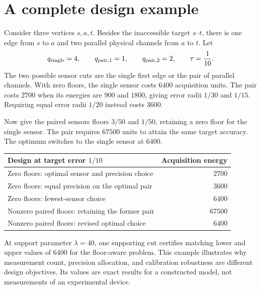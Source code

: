 \section{A complete design example}

Consider three vertices $s,a,t$. Besides the inaccessible target $s$--$t$,
there is one edge from $s$ to $a$ and two parallel physical channels from $a$
to $t$. Let
\[
 q_{\rm single}=4,\qquad q_{\rm pair,1}=1,\qquad
 q_{\rm pair,2}=2,\qquad \tau=\frac1{10}.
\]
The two possible sensor cuts are the single first edge or the pair of parallel
channels. With zero floors, the single sensor costs $6400$ acquisition units.
The pair costs $2700$ when its energies are $900$ and $1800$, giving error
radii $1/30$ and $1/15$. Requiring equal error radii $1/20$ instead costs $3600$.

Now give the paired sensors floors $3/50$ and $1/50$, retaining a zero floor
for the single sensor. The pair requires $67500$ units to attain the same target
accuracy. The optimum switches to the single sensor at $6400$.

\begin{center}
\begin{tabular}{lr}
\toprule
Design at target error $1/10$ & Acquisition energy\\
\midrule
Zero floors: optimal sensor and precision choice & $2700$\\
Zero floors: equal precision on the optimal pair & $3600$\\
Zero floors: fewest-sensor choice & $6400$\\
Nonzero paired floors: retaining the former pair & $67500$\\
Nonzero paired floors: revised optimal choice & $6400$\\
\bottomrule
\end{tabular}
\end{center}

At support parameter $\lambda=40$, one supporting cut certifies matching lower
and upper values of $6400$ for the floor-aware problem. This example illustrates
why measurement count, precision allocation, and calibration robustness are
different design objectives. Its values are exact results for a constructed
model, not measurements of an experimental device.

